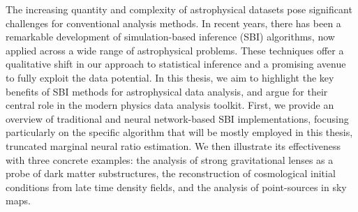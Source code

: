 The increasing quantity and complexity of astrophysical datasets pose significant challenges for conventional analysis methods. In recent years, there has been a remarkable development of simulation-based inference (SBI) algorithms, now applied across a wide range of astrophysical problems. These techniques offer a qualitative shift in our approach to statistical inference and a promising avenue to fully exploit the data potential.
In this thesis, we aim to highlight the key benefits of SBI methods for astrophysical data analysis, and argue for their central role in the modern physics data analysis toolkit. First, we provide an overview of traditional and neural network-based SBI implementations, focusing particularly on the specific algorithm that will be mostly employed in this thesis, truncated marginal neural ratio estimation. We then illustrate its effectiveness with three concrete examples: the analysis of strong gravitational lenses as a probe of dark matter substructures, the reconstruction of cosmological initial conditions from late time density fields, and the analysis of point-sources in sky maps. 
